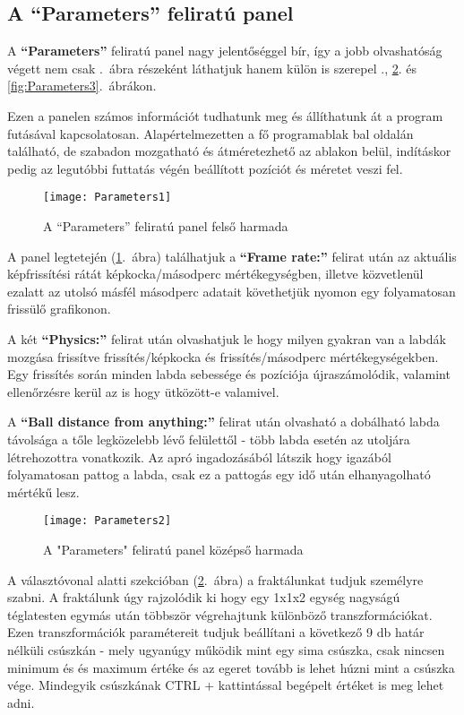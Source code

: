 \subsection{A ``Parameters'' feliratú panel}

A \textbf{``Parameters''} feliratú panel nagy jelentőséggel bír, így a jobb olvashatóság végett nem csak .~ábra részeként láthatjuk hanem külön is szerepel ., \ref{fig:Parameters2}. és \ref{fig:Parameters3}.~ábrákon.

Ezen a panelen számos információt tudhatunk meg és állíthatunk át a program futásával kapcsolatosan. Alapértelmezetten a fő programablak bal oldalán található, de szabadon mozgatható és átméretezhető az ablakon belül, indításkor pedig az legutóbbi futtatás végén beállított pozíciót és méretet veszi fel. 

\begin{figure}[H]
	\centering
	\texttt{[image: Parameters1]}
	\caption{A ``Parameters'' feliratú panel felső harmada}
	\label{fig:Parameters1}
\end{figure}

A panel legtetején (\ref{fig:Parameters1}.~ábra) találhatjuk a \textbf{``Frame rate:''} felirat után az aktuális képfrissítési rátát képkocka/másodperc mértékegységben, illetve közvetlenül ezalatt az utolsó másfél másodperc adatait követhetjük nyomon egy folyamatosan frissülő grafikonon. 

A két \textbf{``Physics:''} felirat után olvashatjuk le hogy milyen gyakran van a labdák mozgása frissítve frissítés/képkocka és frissítés/másodperc mértékegységekben. Egy frissítés során minden labda sebessége és pozíciója újraszámolódik, valamint ellenőrzésre kerül az is hogy ütközött-e valamivel. 

A \textbf{``Ball distance from anything:''} felirat után olvasható a dobálható labda távolsága a tőle legközelebb lévő felülettől - több labda esetén az utoljára létrehozottra vonatkozik. Az apró ingadozásából látszik hogy igazából folyamatosan pattog a labda, csak ez a pattogás egy idő után elhanyagolható mértékű lesz.

\begin{figure}[H]
	\centering
	\texttt{[image: Parameters2]}
	\caption{A "Parameters" feliratú panel középső harmada}
	\label{fig:Parameters2}
\end{figure}

A választóvonal alatti szekcióban (\ref{fig:Parameters2}.~ábra) a fraktálunkat tudjuk személyre szabni. A fraktálunk úgy rajzolódik ki hogy egy 1x1x2 egység nagyságú téglatesten egymás után többször végrehajtunk különböző transzformációkat. Ezen transzformációk paramétereit tudjuk beállítani a következő 9 db határ nélküli csúszkán - mely ugyanúgy működik mint egy sima csúszka, csak nincsen minimum és és maximum értéke és az egeret tovább is lehet húzni mint a csúszka vége. Mindegyik csúszkának CTRL + kattintással begépelt értéket is meg lehet adni. 


